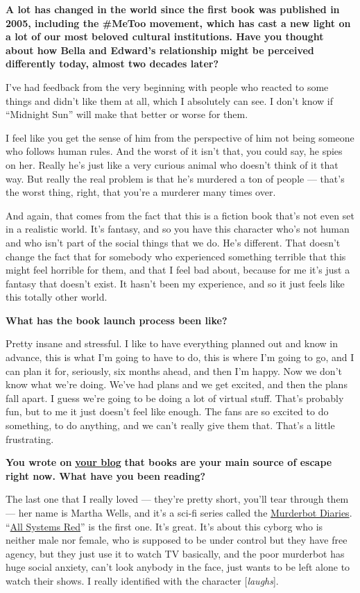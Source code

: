 \textbf{A lot has changed in the world since the first book was
published in 2005, including the \#MeToo movement, which has cast a new
light on a lot of our most beloved cultural institutions. Have you
thought about how Bella and Edward's relationship might be perceived
differently today, almost two decades later?}

I've had feedback from the very beginning with people who reacted to
some things and didn't like them at all, which I absolutely can see. I
don't know if ``Midnight Sun'' will make that better or worse for them.

I feel like you get the sense of him from the perspective of him not
being someone who follows human rules. And the worst of it isn't that,
you could say, he spies on her. Really he's just like a very curious
animal who doesn't think of it that way. But really the real problem is
that he's murdered a ton of people --- that's the worst thing, right,
that you're a murderer many times over.

And again, that comes from the fact that this is a fiction book that's
not even set in a realistic world. It's fantasy, and so you have this
character who's not human and who isn't part of the social things that
we do. He's different. That doesn't change the fact that for somebody
who experienced something terrible that this might feel horrible for
them, and that I feel bad about, because for me it's just a fantasy that
doesn't exist. It hasn't been my experience, and so it just feels like
this totally other world.

\textbf{What has the book launch process been like?}

Pretty insane and stressful. I like to have everything planned out and
know in advance, this is what I'm going to have to do, this is where I'm
going to go, and I can plan it for, seriously, six months ahead, and
then I'm happy. Now we don't know what we're doing. We've had plans and
we get excited, and then the plans fall apart. I guess we're going to be
doing a lot of virtual stuff. That's probably fun, but to me it just
doesn't feel like enough. The fans are so excited to do something, to do
anything, and we can't really give them that. That's a little
frustrating.

\textbf{You wrote on}
\textbf{\href{https://stepheniemeyer.com/updates}{your blog}}
\textbf{that books are your main source of escape right now. What have
you been reading?}

The last one that I really loved --- they're pretty short, you'll tear
through them --- her name is Martha Wells, and it's a sci-fi series
called the
\href{https://www.nytimes.com/2020/05/26/books/review/docile-murderbot-otaku-hotspur-shorefall.html}{Murderbot
Diaries}.
``\href{https://www.nytimes.com/2018/11/30/books/review/martha-wells-exit-strategy.html}{All
Systems Red}'' is the first one. It's great. It's about this cyborg who
is neither male nor female, who is supposed to be under control but they
have free agency, but they just use it to watch TV basically, and the
poor murderbot has huge social anxiety, can't look anybody in the face,
just wants to be left alone to watch their shows. I really identified
with the character {[}\emph{laughs}{]}.

